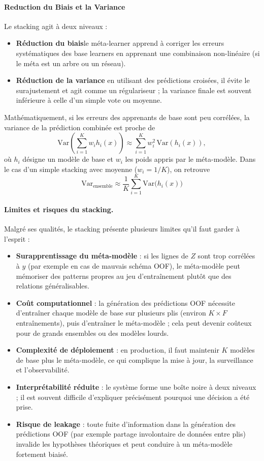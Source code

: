 \paragraph{Reduction du Biais et la Variance }
Le stacking agit à deux niveaux :
\begin{itemize}
  \item \textbf{Réduction du biais}le méta-learner apprend à corriger les erreurs systématiques des base learners en apprenant une combinaison non-linéaire (si le méta est un arbre ou un réseau).
  \item \textbf{Réduction de la variance} en utilisant des prédictions croisées, il évite le surajustement et agit comme un régulariseur ; la variance finale est souvent inférieure à celle d’un simple vote ou moyenne.
\end{itemize}
Mathématiquement, si les erreurs des apprenants de base sont peu corrélées, la variance de la prédiction combinée est proche de
\[
  \text{Var}\left(\sum_{i=1}^K w_i h_i(x)\right) \approx \sum_{i=1}^K w_i^2\,\text{Var}(h_i(x)),
\]
où $h_i$ désigne un modèle de base et $w_i$ les poids appris par le méta-modèle. Dans le cas d'un simple stacking avec moyenne ($w_i = 1/K$), on retrouve
\[
  \text{Var}_{\text{ensemble}} \approx \frac{1}{K} \sum_{i=1}^K \text{Var}\bigl(h_i(x)\bigr)
\]



\paragraph{Limites et risques du stacking.}
Malgré ses qualités, le stacking présente plusieurs limites qu'il faut garder à l'esprit :
\begin{itemize}
  \item \textbf{Surapprentissage du méta-modèle} : si les lignes de $Z$ sont trop corrélées à $y$
  (par exemple en cas de mauvais schéma OOF), le méta-modèle peut mémoriser des
  patterns propres au jeu d'entraînement plutôt que des relations généralisables.
  \item \textbf{Coût computationnel} : la génération des prédictions OOF nécessite d'entraîner chaque
  modèle de base sur plusieurs plis (environ $K \times F$ entraînements), puis d'entraîner le
  méta-modèle ; cela peut devenir coûteux pour de grands ensembles ou des modèles lourds.
  \item \textbf{Complexité de déploiement} : en production, il faut maintenir $K$ modèles de base
  plus le méta-modèle, ce qui complique la mise à jour, la surveillance et l'observabilité.
  \item \textbf{Interprétabilité réduite} : le système forme une boîte noire à deux niveaux ; il est
  souvent difficile d'expliquer précisément pourquoi une décision a été prise.
  \item \textbf{Risque de leakage} : toute fuite d'information dans la génération des prédictions OOF
  (par exemple partage involontaire de données entre plis) invalide les hypothèses
  théoriques et peut conduire à un méta-modèle fortement biaisé.
\end{itemize}

